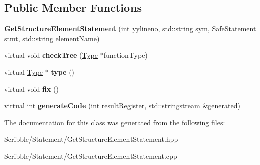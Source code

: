 \subsection*{Public Member Functions}
\begin{DoxyCompactItemize}
\item 
\hypertarget{class_get_structure_element_statement_a677b807cdfc2e050a0ca3ea618a367a1}{{\bfseries Get\-Structure\-Element\-Statement} (int yylineno, std\-::string sym, Safe\-Statement stmt, std\-::string element\-Name)}\label{class_get_structure_element_statement_a677b807cdfc2e050a0ca3ea618a367a1}

\item 
\hypertarget{class_get_structure_element_statement_a899cd9373caad69f25f983b22d09e771}{virtual void {\bfseries check\-Tree} (\hyperlink{class_type}{Type} $\ast$function\-Type)}\label{class_get_structure_element_statement_a899cd9373caad69f25f983b22d09e771}

\item 
\hypertarget{class_get_structure_element_statement_ab82b0fb53a89612690e0fb31b55caf36}{virtual \hyperlink{class_type}{Type} $\ast$ {\bfseries type} ()}\label{class_get_structure_element_statement_ab82b0fb53a89612690e0fb31b55caf36}

\item 
\hypertarget{class_get_structure_element_statement_a7d6dcbb4073f5b3a603f2eb4a0dfdba4}{virtual void {\bfseries fix} ()}\label{class_get_structure_element_statement_a7d6dcbb4073f5b3a603f2eb4a0dfdba4}

\item 
\hypertarget{class_get_structure_element_statement_a434285ac9d13c1917a53ca83b5092c30}{virtual int {\bfseries generate\-Code} (int result\-Register, std\-::stringstream \&generated)}\label{class_get_structure_element_statement_a434285ac9d13c1917a53ca83b5092c30}

\end{DoxyCompactItemize}


The documentation for this class was generated from the following files\-:\begin{DoxyCompactItemize}
\item 
Scribble/\-Statement/Get\-Structure\-Element\-Statement.\-hpp\item 
Scribble/\-Statement/Get\-Structure\-Element\-Statement.\-cpp\end{DoxyCompactItemize}
